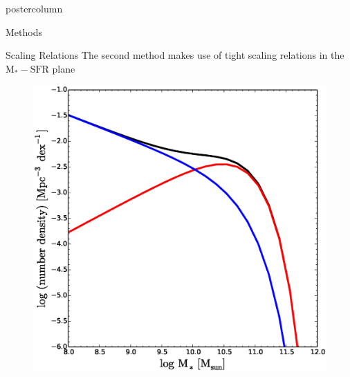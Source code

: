 \documentclass{beamer}
\begin{document}
\begin{frame}
\begin{columns}
\begin{column}{.5\textwidth}
\begin{beamercolorbox}[center,wd=\textwidth]{postercolumn}
\begin{minipage}[T]{.95\textwidth}
{\begin{myblock}{\LARGE Methods}
					\end{myblock}\vfill
					\begin{myblock}{\LARGE Scaling Relations}
						The second method makes use of tight scaling relations in the
						$\mathrm{M_{*}-SFR}$ plane
						\begin{figure}
							\begin{minipage}{0.4\textwidth}
								\centering\includegraphics[width=\textwidth]{img/Baldry.eps}
								\caption{\cite{baldry2012galaxy}}
							\end{minipage}
							\begin{minipage}{0.4\textwidth}

\end{minipage}
\end{figure}
\end{myblock}}
\end{minipage}
\end{beamercolorbox}
\end{column}
\end{columns}
\end{frame}
\end{document}
